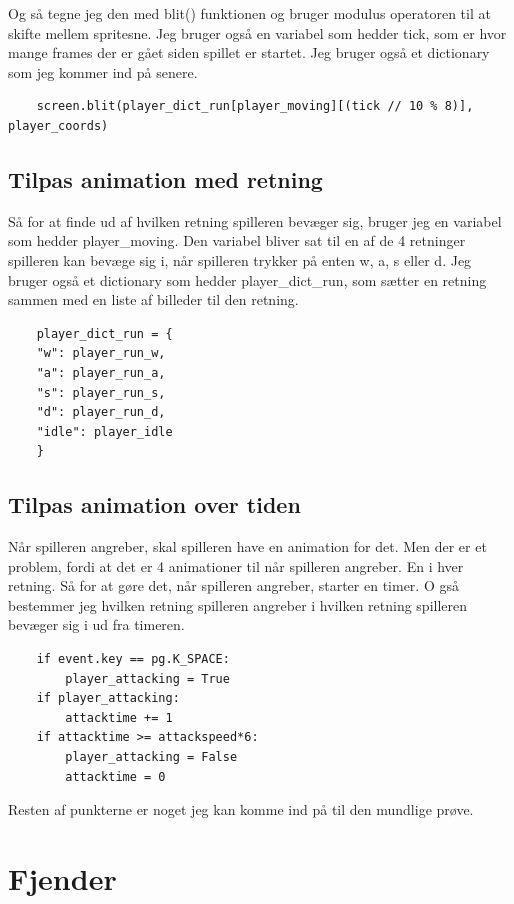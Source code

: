 \documentclass{article}
\begin{document}
    Og så tegne jeg den med blit() funktionen og bruger modulus operatoren til at skifte mellem spritesne.
    Jeg bruger også en variabel som hedder tick, som er hvor mange frames der er gået siden spillet er startet.
    Jeg bruger også et dictionary som jeg kommer ind på senere.
    \begin{verbatim}
    screen.blit(player_dict_run[player_moving][(tick // 10 % 8)], player_coords)
    \end{verbatim}

    \subsection{Tilpas animation med retning}
    Så for at finde ud af hvilken retning spilleren bevæger sig, bruger jeg en variabel som hedder player\_moving.
    Den variabel bliver sat til en af de 4 retninger spilleren kan bevæge sig i, når spilleren trykker på enten w, a, s eller d.
    Jeg bruger også et dictionary som hedder player\_dict\_run, som sætter en retning sammen med en liste af billeder til den retning.
    \begin{verbatim}
    player_dict_run = {
    "w": player_run_w,
    "a": player_run_a,
    "s": player_run_s,
    "d": player_run_d,
    "idle": player_idle
    }
    \end{verbatim}

    \subsection{Tilpas animation over tiden}
    Når spilleren angreber, skal spilleren have en animation for det. Men der er et problem,
    fordi at det er 4 animationer til når spilleren angreber. En i hver retning. 
    Så for at gøre det, når spilleren angreber, starter en timer. 
    O gså bestemmer jeg hvilken retning spilleren angreber i hvilken retning spilleren bevæger sig i ud fra timeren.
    \begin{verbatim}
    if event.key == pg.K_SPACE:
        player_attacking = True
    if player_attacking:
        attacktime += 1
    if attacktime >= attackspeed*6:
        player_attacking = False
        attacktime = 0
    \end{verbatim}

    Resten af punkterne er noget jeg kan komme ind på til den mundlige prøve.
\section{Fjender}
\end{document}
